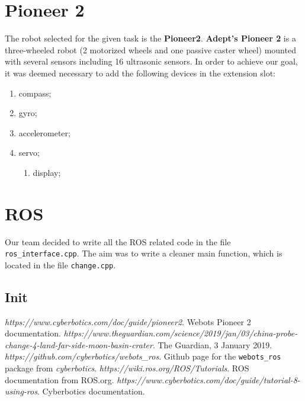 \documentclass[a4paper]{article}
\begin{document}
	\section{Pioneer 2}
	The robot selected for the given task is the \textbf{Pioneer2}. \newline\textbf{Adept's Pioneer 2}\cite{pioneer2} is a three-wheeled robot (2 motorized wheels and one passive caster wheel) mounted with several sensors including 16 ultrasonic sensors.
	In order to achieve our goal, it was deemed necessary to add the following devices in the extension slot:
		\begin{enumerate}
			\item compass;
			\item gyro;	
			\item accelerometer;
			\item servo;
				\begin{enumerate}
					\item display;
				\end{enumerate}
		\end{enumerate}
	
	\section{ROS}
	Our team decided to write all the ROS related code in the file \texttt{ros\_interface.cpp}. The aim was to write a cleaner main function, which is located in the file \texttt{change.cpp}.
	\subsection{Init}
	
	
	\newpage
	
	\begin{thebibliography}{9}
		\textit{https://www.cyberbotics.com/doc/guide/pioneer2}. \newline
		Webots Pioneer 2 documentation.
		\textit{https://www.theguardian.com/science/2019/jan/03/china-probe-change-4-land-far-side-moon-basin-crater}. \newline
		The Guardian, 3 January 2019.
		\textit{https://github.com/cyberbotics/webots\_ros}. \newline
		Github page for the \texttt{webots\_ros} package from \textit{cyberbotics}.
		\textit{https://wiki.ros.org/ROS/Tutorials}. \newline
		ROS documentation from ROS.org.
		\textit{https://www.cyberbotics.com/doc/guide/tutorial-8-using-ros}. \newline
		Cyberbotics documentation.
	\end{thebibliography}
\end{document}
